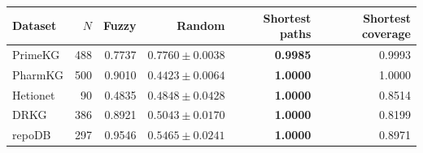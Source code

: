 \begin{tabular}{lrrrrr}
\toprule
Dataset & $N$ & Fuzzy & Random & Shortest paths & Shortest coverage \\
\midrule
PrimeKG & 488 & 0.7737 & $0.7760\pm0.0038$ & \textbf{0.9985} & 0.9993 \\
PharmKG & 500 & 0.9010 & $0.4423\pm0.0064$ & \textbf{1.0000} & 1.0000 \\
Hetionet & 90 & 0.4835 & $0.4848\pm0.0428$ & \textbf{1.0000} & 0.8514 \\
DRKG & 386 & 0.8921 & $0.5043\pm0.0170$ & \textbf{1.0000} & 0.8199 \\
repoDB & 297 & 0.9546 & $0.5465\pm0.0241$ & \textbf{1.0000} & 0.8971 \\
\bottomrule
\end{tabular}
